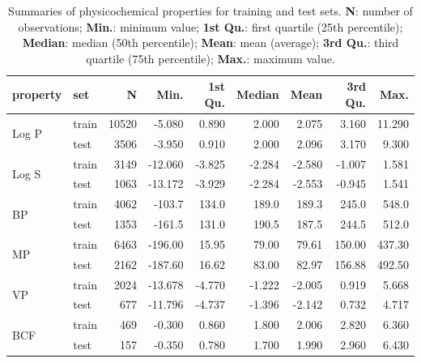 \documentclass[10pt, letter]{article}
\renewcommand{\=}{\, =\, }
\newcommand{\+}{\, +\, }
\renewcommand{\-}{\, -\, }
\begin{document}
\begin{table}[H]
\begin{center}
\begin{tabular}{llrrrrrrr}
\toprule
{\bf property} & {\bf set} & {\bf N} & {\bf Min.} & {\bf 1st Qu.} &  {\bf Median}  & {\bf Mean}  & {\bf 3rd Qu.} & {\bf Max.}\\
\midrule
\multirow{2}{15mm}{Log P}
& train &  10520 & -5.080 & 0.890 & 2.000 & 2.075 & 3.160 & 11.290\\
& test &  3506 & -3.950 & 0.910 & 2.000 & 2.096 & 3.170 & 9.300\\
\midrule
\multirow{2}{15mm}{Log S}
& train &  3149 & -12.060 & -3.825 & -2.284 & -2.580 & -1.007 & 1.581\\
& test &  1063 & -13.172 & -3.929 & -2.284 & -2.553 & -0.945 & 1.541\\
\midrule
\multirow{2}{15mm}{BP}
& train &  4062 & -103.7 & 134.0 & 189.0 & 189.3 & 245.0 & 548.0\\
& test &  1353 & -161.5 & 131.0 & 190.5 & 187.5 & 244.5 & 512.0\\
\midrule
\multirow{2}{15mm}{MP}
& train &  6463 & -196.00 & 15.95 & 79.00 & 79.61 & 150.00 & 437.30\\
& test &  2162 & -187.60 & 16.62 & 83.00 & 82.97 & 156.88 & 492.50\\
\midrule
\multirow{2}{15mm}{VP}
& train &  2024 & -13.678 & -4.770 & -1.222 & -2.005 & 0.919 & 5.668\\
& test &  677 & -11.796 & -4.737 & -1.396 & -2.142 & 0.732 & 4.717\\
\midrule
\multirow{2}{15mm}{BCF}
& train &  469 & -0.300 & 0.860 & 1.800 & 2.006 & 2.820 & 6.360\\
& test &  157 & -0.350 & 0.780 & 1.700 & 1.990 & 2.960 & 6.430\\
\hline
\end{tabular}
\end{center}
\caption{Summaries of physicochemical properties for training and test sets. \textbf{N}: number of observations; \textbf{Min.}: minimum value; \textbf{1st Qu.}: first quartile (25th percentile);
\textbf{Median}: median (50th percentile); \textbf{Mean}: mean (average); \textbf{3rd Qu.}: third quartile (75th percentile);
\textbf{Max.}: maximum value.}
\end{table}
\end{document}
